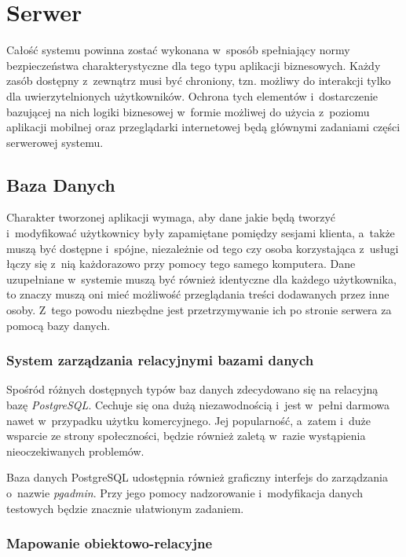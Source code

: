\documentclass[11pt]{aghdpl}
\begin{document}
\section {Serwer}

Całość systemu powinna zostać wykonana w~sposób spełniający normy bezpieczeństwa charakterystyczne dla tego typu aplikacji biznesowych. Każdy zasób dostępny z~zewnątrz musi być chroniony, tzn. możliwy do interakcji tylko dla uwierzytelnionych użytkowników. Ochrona tych elementów i~dostarczenie bazującej na nich logiki biznesowej w~formie możliwej do użycia z~poziomu aplikacji mobilnej oraz przeglądarki internetowej będą głównymi zadaniami części serwerowej systemu.

\subsection{Baza Danych}
\label{sec:bazaDanych}

Charakter tworzonej aplikacji wymaga, aby dane jakie będą tworzyć i~modyfikować użytkownicy były zapamiętane pomiędzy sesjami klienta, a~także muszą być dostępne i~spójne, niezależnie od tego czy osoba korzystająca z~usługi łączy się z~nią każdorazowo przy pomocy tego samego komputera. Dane uzupełniane w~systemie muszą być również identyczne dla każdego użytkownika, to znaczy muszą oni mieć możliwość przeglądania treści dodawanych przez inne osoby. Z~tego powodu niezbędne jest przetrzymywanie ich po stronie serwera za pomocą bazy danych.

\subsubsection{System zarządzania relacyjnymi bazami danych}

Spośród różnych dostępnych typów baz danych zdecydowano się na relacyjną bazę \emph{PostgreSQL}. Cechuje się ona dużą niezawodnością i~jest w~pełni darmowa nawet w~przypadku użytku komercyjnego. Jej popularność, a~zatem i~duże wsparcie ze strony społeczności, będzie również zaletą w~razie wystąpienia nieoczekiwanych problemów.

Baza danych PostgreSQL udostępnia również graficzny interfejs do zarządzania o~nazwie \emph{pgadmin}. Przy jego pomocy nadzorowanie i~modyfikacja danych testowych będzie znacznie ułatwionym zadaniem.

\subsubsection{Mapowanie obiektowo-relacyjne}
\end{document}
